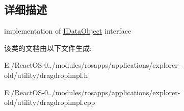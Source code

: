 \subsection{详细描述}
implementation of \hyperlink{interface_i_data_object}{I\+Data\+Object} interface 

该类的文档由以下文件生成\+:\begin{DoxyCompactItemize}
\item 
E\+:/\+React\+O\+S-\/0../modules/rosapps/applications/explorer-\/old/utility/dragdropimpl.\+h\item 
E\+:/\+React\+O\+S-\/0../modules/rosapps/applications/explorer-\/old/utility/dragdropimpl.\+cpp\end{DoxyCompactItemize}
